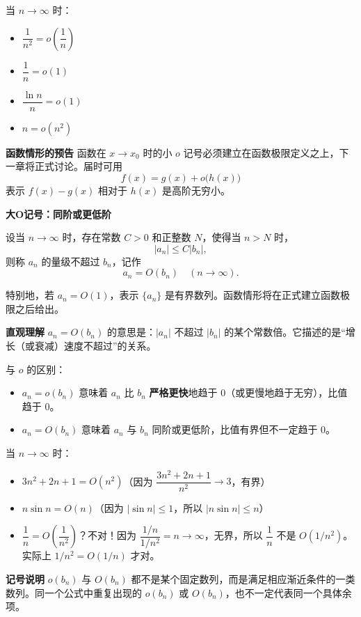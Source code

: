 \documentclass[fontset=fandol]{ctexart}
\newenvironment{custom}[1]{\par\noindent\textbf{#1}\quad}{\par\vspace{0.8em}}
\newenvironment{intuition}{\par\noindent\textbf{直观理解}\quad}{\par\vspace{0.8em}}
\begin{document}
\begin{example}[小o记号的例子]
当 \(n \to \infty\) 时：
\begin{itemize}
\item \(\dfrac{1}{n^2} = o\left(\dfrac{1}{n}\right)\)
\item \(\dfrac{1}{n} = o(1)\)
\item \(\dfrac{\ln n}{n} = o(1)\)
\item \(n = o(n^2)\)
\end{itemize}

\begin{custom}{函数情形的预告}
函数在 \(x\to x_0\) 时的小 \(o\) 记号必须建立在函数极限定义之上，下一章将正式讨论。届时可用
\[
f(x)=g(x)+o\bigl(h(x)\bigr)
\]
表示 \(f(x)-g(x)\) 相对于 \(h(x)\) 是高阶无穷小。
\end{custom}
\end{example}

\textbf{大O记号：同阶或更低阶}

\begin{definition}[大O记号]
设当 \(n\to\infty\) 时，存在常数 \(C>0\) 和正整数 \(N\)，使得当 \(n>N\) 时，
\[
|a_n| \leq C |b_n|,
\]
则称 \(a_n\) 的量级不超过 \(b_n\)，记作
\[
a_n = O(b_n) \quad (n \to \infty).
\]

特别地，若 \(a_n=O(1)\)，表示 \(\{a_n\}\) 是有界数列。函数情形将在正式建立函数极限之后给出。
\end{definition}

\begin{intuition}
\(a_n = O(b_n)\) 的意思是：\(|a_n|\) 不超过 \(|b_n|\) 的某个常数倍。它描述的是“增长（或衰减）速度不超过”的关系。

与 \(o\) 的区别：
\begin{itemize}
\item \(a_n = o(b_n)\) 意味着 \(a_n\) 比 \(b_n\) \textbf{严格更快}地趋于 0（或更慢地趋于无穷），比值趋于 0。
\item \(a_n = O(b_n)\) 意味着 \(a_n\) 与 \(b_n\) 同阶或更低阶，比值有界但不一定趋于 0。
\end{itemize}
\end{intuition}

\begin{example}[大O记号的例子]
当 \(n \to \infty\) 时：
\begin{itemize}
\item \(3n^2 + 2n + 1 = O(n^2)\)（因为 \(\dfrac{3n^2+2n+1}{n^2} \to 3\)，有界）
\item \(n \sin n = O(n)\)（因为 \(|\sin n| \leq 1\)，所以 \(|n \sin n| \leq n\)）
\item \(\dfrac{1}{n} = O\left(\dfrac{1}{n^2}\right)\)？不对！因为 \(\dfrac{1/n}{1/n^2} = n \to \infty\)，无界，所以 \(\dfrac{1}{n}\) 不是 \(O(1/n^2)\)。实际上 \(1/n^2 = O(1/n)\) 才对。
\end{itemize}

\begin{custom}{记号说明}
\(o(b_n)\) 与 \(O(b_n)\) 都不是某个固定数列，而是满足相应渐近条件的一类数列。同一个公式中重复出现的 \(o(b_n)\) 或 \(O(b_n)\)，也不一定代表同一个具体余项。
\end{custom}
\end{example}
\end{document}
